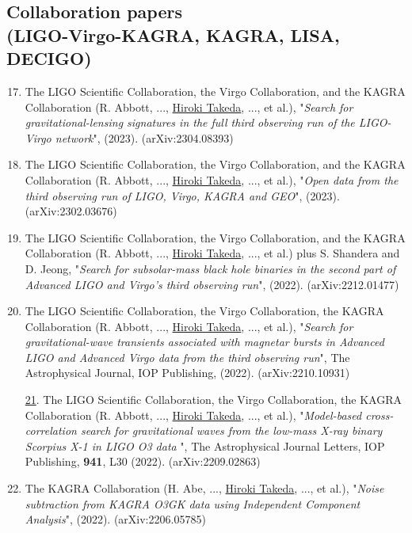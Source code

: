 \documentclass[uplatex, 12pt]{article}
\begin{document}
\subsection*{Collaboration papers \\(LIGO-Virgo-KAGRA, KAGRA, LISA, DECIGO)}
\begin{enumerate}
\setcounter{enumi}{16}
\item The LIGO Scientific Collaboration, the Virgo Collaboration, and the KAGRA Collaboration (R. Abbott, ..., \uline{Hiroki Takeda}, ..., et al.), "\emph{Search for gravitational-lensing signatures in the full third observing run of the LIGO-Virgo network}", (2023). (arXiv:2304.08393)\\

\item The LIGO Scientific Collaboration, the Virgo Collaboration, and the KAGRA Collaboration (R. Abbott, ..., \uline{Hiroki Takeda}, ..., et al.), "\emph{Open data from the third observing run of LIGO, Virgo, KAGRA and GEO}", (2023). (arXiv:2302.03676)\\

\item The LIGO Scientific Collaboration, the Virgo Collaboration, and the KAGRA Collaboration (R. Abbott, ..., \uline{Hiroki Takeda}, ..., et al.) plus S. Shandera and D. Jeong, "\emph{Search for subsolar-mass black hole binaries in the second part of Advanced LIGO and Virgo's third observing run}", (2022). (arXiv:2212.01477)\\

\item The LIGO Scientific Collaboration, the Virgo Collaboration, the KAGRA Collaboration (R. Abbott, ..., \uline{Hiroki Takeda}, ..., et al.), "\emph{Search for gravitational-wave transients associated with magnetar bursts in Advanced LIGO and Advanced Virgo data from the third observing run}", The Astrophysical Journal, IOP Publishing, (2022). (arXiv:2210.10931)\\

\item[\uline{21}.] The LIGO Scientific Collaboration, the Virgo Collaboration, the KAGRA Collaboration (R. Abbott, ..., \uline{Hiroki Takeda}, ..., et al.), "\emph{Model-based cross-correlation search for gravitational waves from the low-mass X-ray binary Scorpius X-1 in LIGO O3 data }", The Astrophysical Journal Letters, IOP Publishing, {\bf 941}, L30 (2022). (arXiv:2209.02863)\\

\setcounter{enumi}{21}
\item The KAGRA Collaboration (H. Abe, ..., \uline{Hiroki Takeda}, ..., et al.), "\emph{Noise subtraction from KAGRA O3GK data using Independent Component Analysis}", (2022). (arXiv:2206.05785)\\


\end{enumerate}
\end{document}
